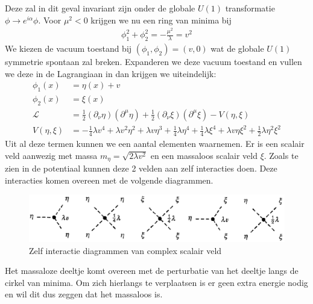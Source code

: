\documentclass[../main.tex]{subfiles}
\begin{document}
Deze zal in dit geval invariant zijn onder de globale $U(1)$ transformatie $\phi \rightarrow e^{i\alpha}\phi$. Voor $\mu^2<0$ krijgen we nu een ring van minima bij
\begin{equation}
    \begin{aligned}
        \label{eq:complex_symm_breking}
        \phi_1^2+\phi_2^2 = -\frac{\mu^2}{\lambda} =v^2
    \end{aligned}
\end{equation}
We kiezen de vacuum toestand bij $(\phi_1, \phi_2) = (v,0)$ wat de globale $U(1)$ symmetrie spontaan zal breken. Expanderen we deze vacuum toestand en vullen we deze in de Lagrangiaan in dan krijgen we uiteindelijk:
\begin{equation}
    \begin{aligned}
        \label{eq:comple_scalair_veld_symm_breking}
        \phi_1(x) &= \eta(x) + v\\
        \phi_2(x) &= \xi(x)\\
        \mathcal{L} &= \frac{1}{2} (\partial_\nu \eta) (\partial^\mu \eta) + \frac{1}{2} (\partial_\nu \xi) (\partial^\mu \xi) - V(\eta, \xi)\\
        V(\eta, \xi) &= -\frac{1}{4} \lambda v^4 + \lambda v^2 \eta^2 + \lambda v \eta^3 + \frac{1}{4} \lambda \eta^4 + \frac{1}{4} \lambda \xi^4 + \lambda v \eta\xi^2 + \frac{1}{2} \lambda \eta^2\xi^2
    \end{aligned}
\end{equation}
Uit al deze termen kunnen we een aantal elementen waarnemen. Er is een scalair veld aanwezig met massa $m_\eta = \sqrt{2\lambda v^2}$ en een massaloos scalair veld $\xi$. Zoals te zien in de potentiaal kunnen deze 2 velden aan zelf interacties doen. Deze interacties komen overeen met de volgende diagrammen.

\begin{figure}[h]
    \centering
    \includegraphics[width=0.8\linewidth]{higgs_boson/complex_scalair_veld_int.png}
    \caption{Zelf interactie diagrammen van complex scalair veld}%
    \label{fig:higgs_boson/complex_scalair_veld_int}
\end{figure}

Het massaloze deeltje komt overeen met de perturbatie van het deeltje langs de cirkel van minima. Om zich hierlangs te verplaatsen is er geen extra energie nodig en wil dit dus zeggen dat het massaloos is.
\end{document}
